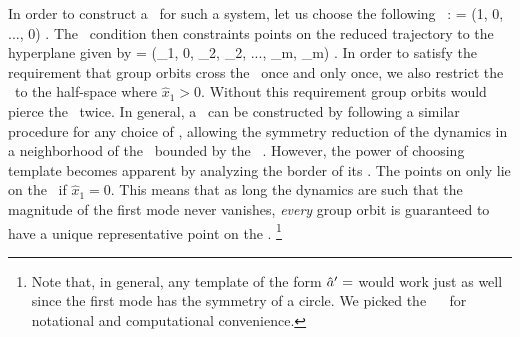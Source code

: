 In order to construct a \slicePlane\ for such a system, let us choose the following \slice\ \template:
\beq
	\slicep = (1, 0, ..., 0) .
The \slice\ condition  then constraints points on the reduced trajectory to the hyperplane given by
\beq
	\sspRed = (_1, 0, _2, _2, ..., _m, _m) .
In order to satisfy the requirement that group orbits cross the \slice\ once and only once, we also restrict the \slicePlane\ to the half-space where $\hat{x}_1 > 0$.
Without this requirement group orbits would pierce the \slicePlane\ twice.
In general, a \slicePlane\ can be constructed by following a similar procedure for any choice of \template, allowing the symmetry
reduction of the dynamics in a neighborhood of the \template\ bounded by the \sliceBord\ .
However, the power of choosing template  becomes apparent by analyzing the border of its \slicePlane.
The points on  only lie on the \sliceBord\ if $\hat{x}_1 = 0$.
This means that as long the dynamics are such that the magnitude of the first mode never vanishes,
\emph{every} group orbit is guaranteed to have a unique representative point on the \slicePlane.
\footnote{Note that, in general, any template of the form ${\hat{a}'} =$  would work just as well since the first mode has the symmetry of a circle. We picked the \slice\ \template\
 for notational and computational convenience.}
%

